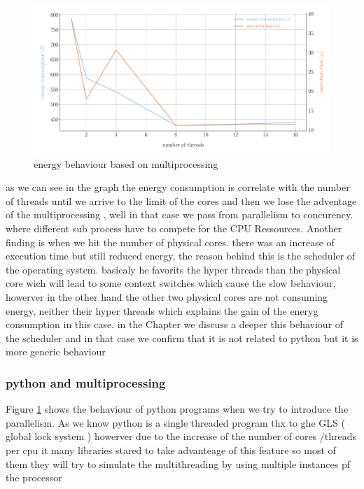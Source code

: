 \begin{figure}[hbt]
    \centering
    \includegraphics[width=\linewidth]{imgs/multiprocessing_energyvstime}
    \caption{energy behaviour based on multiprocessing}
    \label{fig:python_multiprocessing}
\end{figure}

as we can see in the graph the energy consumption is correlate with the number of threads until we arrive to the limit of the cores and then we lose the adventage of the multiprocessing , well in that case we pass from parallelism to concurency. where different sub process have to compete for the CPU Ressources.
Another finding is when we hit the number of physical cores. there was an increase of execution time but still reduced energy, the reason behind this is the scheduler of the operating system. basicaly he favorits the hyper threads than the physical core wich will lead to some context switches which cause the slow behaviour, howerver in the other hand the other two physical cores are not consuming energy, neither their hyper threads which explains the gain of the eneryg consumption in this case.
in the Chapter %
we discuss a deeper this behaviour of the scheduler and in that case we confirm that it is not related to python but it is more generic behaviour %

\subsubsection{python and multiprocessing}
Figure \ref{fig:python_multiprocessing} shows the behaviour of python programs when we try to introduce the parallelism.
As we know python is a single threaded program thx to ghe GLS ( global lock system ) howerver due to the increase of the number of cores /threads per cpu it many libraries stared to take advanteage of this feature so most of them they will try to simulate the multithreading by using multiple instances pf the processor %

